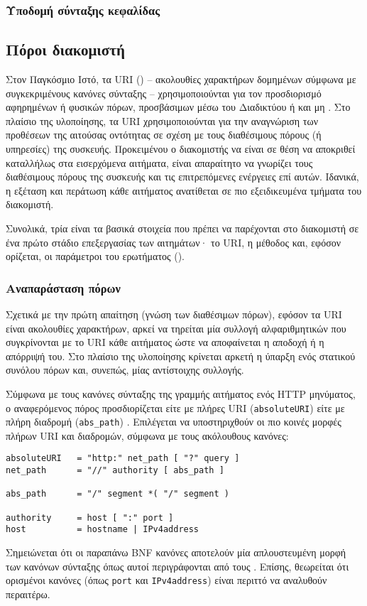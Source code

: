 \subsubsection{Υποδομή σύνταξης κεφαλίδας}


\subsection{Πόροι διακομιστή}

Στον Παγκόσμιο Ιστό, τα URI () -- ακολουθίες
χαρακτήρων δομημένων σύμφωνα με συγκεκριμένους κανόνες σύνταξης --
χρησιμοποιούνται για τον προσδιορισμό αφηρημένων ή φυσικών πόρων, προσβάσιμων
μέσω του Διαδικτύου ή και μη \parencite[1,5]{rfc3986}.
Στο πλαίσιο της υλοποίησης, τα URI χρησιμοποιούνται για την αναγνώριση των
προθέσεων της αιτούσας οντότητας σε σχέση με τους διαθέσιμους πόρους (ή
υπηρεσίες) της συσκευής. Προκειμένου ο διακομιστής να είναι σε θέση να αποκριθεί
καταλλήλως στα εισερχόμενα αιτήματα, είναι απαραίτητο να γνωρίζει τους
διαθέσιμους πόρους της συσκευής και τις επιτρεπόμενες ενέργειες επί αυτών.
Ιδανικά, η εξέταση και περάτωση κάθε αιτήματος ανατίθεται σε πιο εξειδικευμένα
τμήματα του διακομιστή.

Συνολικά, τρία είναι τα βασικά στοιχεία που πρέπει να παρέχονται στο διακομιστή
σε ένα πρώτο στάδιο επεξεργασίας των αιτημάτων· το URI, η μέθοδος και, εφόσον
ορίζεται, οι παράμετροι του ερωτήματος ().

\subsubsection{Αναπαράσταση πόρων}

Σχετικά με την πρώτη απαίτηση (γνώση των διαθέσιμων πόρων),
εφόσον τα URI είναι ακολουθίες χαρακτήρων, αρκεί να τηρείται μία συλλογή
αλφαριθμητικών που συγκρίνονται με το URI κάθε αιτήματος ώστε να αποφαίνεται η
αποδοχή ή η απόρριψή του. Στο πλαίσιο της υλοποίησης κρίνεται αρκετή η ύπαρξη
ενός στατικού συνόλου πόρων και, συνεπώς, μίας αντίστοιχης συλλογής.

Σύμφωνα με τους κανόνες σύνταξης της γραμμής αιτήματος ενός HTTP μηνύματος, ο
αναφερόμενος πόρος προσδιορίζεται είτε με πλήρες URI (\verb~absoluteURI~) είτε
με πλήρη διαδρομή (\verb~abs_path~) \parencite[36--37]{rfc2616}.
Επιλέγεται να υποστηριχθούν οι πιο κοινές μορφές πλήρων URI και διαδρομών,
σύμφωνα με τους ακόλουθους κανόνες:
\begin{lstlisting}
absoluteURI   = "http:" net_path [ "?" query ]
net_path      = "//" authority [ abs_path ]

abs_path      = "/" segment *( "/" segment )

authority     = host [ ":" port ]
host          = hostname | IPv4address
\end{lstlisting}
Σημειώνεται ότι οι παραπάνω BNF κανόνες αποτελούν μία απλουστευμένη μορφή των
κανόνων σύνταξης όπως αυτοί περιγράφονται από τους \textcite[27--28]{rfc2396}.
Επίσης, θεωρείται ότι ορισμένοι κανόνες (όπως \verb~port~ και 
\verb~IPv4address~) είναι περιττό να αναλυθούν περαιτέρω.

